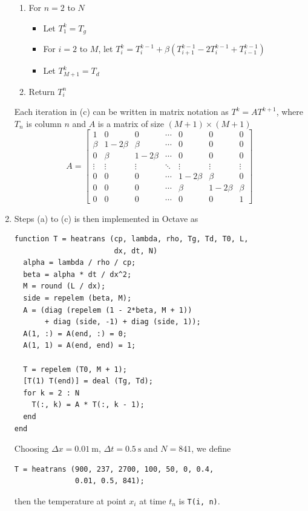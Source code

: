 \documentclass[a4paper,12pt]{article}
\begin{document}
\begin{enumerate}
\begin{enumerate}
      \item For $n = 2$ to $N$
        \begin{itemize}
          \item Let $T_1^k = T_g$
          \item For $i = 2$ to $M$, let $T_i^k = T_i^{k-1}
            + \beta\left(T_{i+1}^{k-1} - 2T_i^{k-1} + T_{i-1}^{k-1}\right)$
          \item Let $T_{M+1}^k = T_d$
        \end{itemize}
      \item Return $T_i^n$
    \end{enumerate}
    Each iteration in (c) can be written in matrix notation as
    $T^k = AT^{k+1}$, where $T_n$ is column $n$ and $A$ is
    a matrix of size $(M+1)\times(M+1)$
    \[A =\begin{bmatrix}
        1 & 0 & 0 & \cdots & 0 & 0 & 0\\
        \beta & 1-2\beta & \beta & \cdots & 0 & 0 & 0\\
        0 & \beta & 1-2\beta & \cdots & 0 & 0 & 0\\
        \vdots & \vdots & \vdots & \ddots & \vdots & \vdots & \vdots\\
        0 & 0 & 0 & \cdots & 1-2\beta & \beta & 0\\
        0 & 0 & 0 & \cdots & \beta & 1-2\beta & \beta\\
        0 & 0 & 0 & \cdots & 0 & 0 & 1
      \end{bmatrix}\]
  \item Steps (a) to (c) is then implemented in Octave as
\begin{verbatim}
function T = heatrans (cp, lambda, rho, Tg, Td, T0, L,
                       dx, dt, N)
  alpha = lambda / rho / cp;
  beta = alpha * dt / dx^2;
  M = round (L / dx);
  side = repelem (beta, M);
  A = (diag (repelem (1 - 2*beta, M + 1))
       + diag (side, -1) + diag (side, 1));
  A(1, :) = A(end, :) = 0;
  A(1, 1) = A(end, end) = 1;

  T = repelem (T0, M + 1);
  [T(1) T(end)] = deal (Tg, Td);
  for k = 2 : N
    T(:, k) = A * T(:, k - 1);
  end
end
\end{verbatim}

    Choosing $\Delta x = \SI{0.01}{\meter}$, $\Delta t = \SI{0.5}{\second}$
    and $N = 841$, we define
\begin{verbatim}
T = heatrans (900, 237, 2700, 100, 50, 0, 0.4,
              0.01, 0.5, 841);
\end{verbatim}
    then the temperature at point $x_i$ at time $t_n$ is \verb|T(i, n)|.
    \pagebreak


\end{enumerate}
\end{document}
